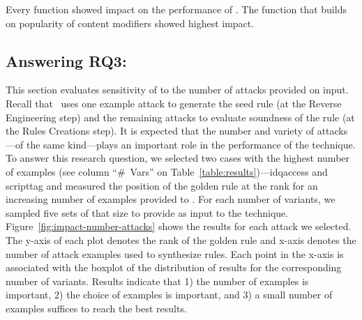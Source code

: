 \documentclass[conference]{IEEEtran}
\begin{document}
\begin{center}
\begin{tcolorbox}[enhanced,width=3.4in,center upper,drop shadow southwest,sharp corners]
Every function showed impact on the performance of \tname. The function that builds on popularity of content
modifiers showed highest impact.
\end{tcolorbox}
\end{center}

\subsection{Answering RQ3: \textRQthree}
\label{sec:answer-rqthree}

This section evaluates sensitivity of \tname{} to the number of
attacks provided on input. Recall that \tname\ uses one example attack
to generate the seed rule (at the Reverse Engineering step) and the
remaining attacks to evaluate soundness of the rule (at the Rules
Creations step). It is expected that the number and variety of
attacks---of the same kind---plays an important role in the
performance of the technique. To answer this research question, we selected two cases with the
highest number of examples (see column ``\#~Vars'' on
Table~\ref{table:results})---idqaccess and scripttag and measured the
position of the golden rule at the rank for an increasing number of
examples provided to \tname. For each number of variants, we sampled
five sets of that size to provide as input to the
technique. Figure~\ref{fig:impact-number-attacks} shows the results
for each attack we selected. The y-axis of each plot denotes the rank
of the golden rule and x-axis denotes the number of attack examples
used to synthesize rules. Each point in the x-axis is associated with
the boxplot of the distribution of results for the corresponding
number of variants. Results indicate that 1) the number of examples is
important, 2) the choice of examples is important, and 3) a small
number of examples suffices to reach the best results.
\end{document}
